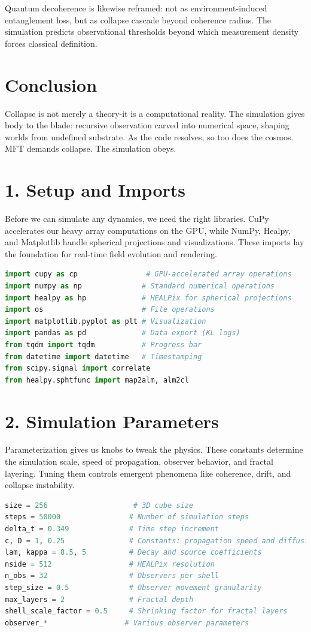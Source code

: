 Quantum decoherence is likewise reframed: not as environment-induced entanglement loss, but as collapse cascade beyond coherence radius. The simulation predicts observational thresholds beyond which measurement density forces classical definition.

\section{Conclusion}
Collapse is not merely a theory-it is a computational reality. The simulation gives body to the blade: recursive observation carved into numerical space, shaping worlds from undefined substrate. As the code resolves, so too does the cosmos. MFT demands collapse. The simulation obeys.


\section*{1. Setup and Imports}
Before we can simulate any dynamics, we need the right libraries. CuPy accelerates our heavy array computations on the GPU, while NumPy, Healpy, and Matplotlib handle spherical projections and visualizations. These imports lay the foundation for real-time field evolution and rendering.
\begin{lstlisting}[language=Python]
import cupy as cp                # GPU-accelerated array operations
import numpy as np              # Standard numerical operations
import healpy as hp             # HEALPix for spherical projections
import os                       # File operations
import matplotlib.pyplot as plt # Visualization
import pandas as pd             # Data export (KL logs)
from tqdm import tqdm           # Progress bar
from datetime import datetime   # Timestamping
from scipy.signal import correlate
from healpy.sphtfunc import map2alm, alm2cl
\end{lstlisting}

\section*{2. Simulation Parameters}
Parameterization gives us knobs to tweak the physics. These constants determine the simulation scale, speed of propagation, observer behavior, and fractal layering. Tuning them controls emergent phenomena like coherence, drift, and collapse instability.
\begin{lstlisting}[language=Python]
size = 256                    # 3D cube size
steps = 50000                # Number of simulation steps
delta_t = 0.349              # Time step increment
c, D = 1, 0.25               # Constants: propagation speed and diffusion
lam, kappa = 8.5, 5          # Decay and source coefficients
nside = 512                  # HEALPix resolution
n_obs = 32                   # Observers per shell
step_size = 0.5              # Observer movement granularity
max_layers = 2               # Fractal depth
shell_scale_factor = 0.5     # Shrinking factor for fractal layers
observer_*                  # Various observer parameters
\end{lstlisting}

